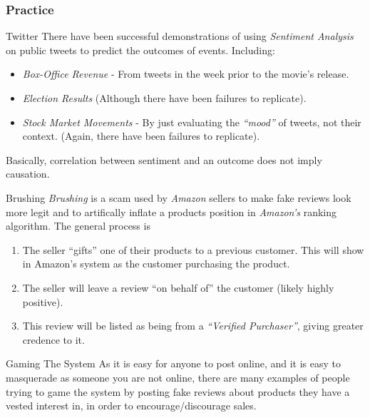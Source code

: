 \documentclass[11pt,a4paper]{article}
\begin{document}
\subsubsection{Practice} \label{sec_SentimentAnalysisPractice}

  \begin{remark}{Twitter}
    There have been successful demonstrations of using \textit{Sentiment Analysis} on public tweets to predict the outcomes of events. Including:
    \begin{itemize}
      \item \textit{Box-Office Revenue} - From tweets in the week prior to the movie's release.
      \item \textit{Election Results} (Although there have been failures to replicate).
      \item \textit{Stock Market Movements} - By just evaluating the \textit{``mood''} of tweets, not their context. (Again, there have been failures to replicate).
    \end{itemize}
    Basically, correlation between sentiment and an outcome does not imply causation.
  \end{remark}

  \begin{remark}{Brushing}
    \textit{Brushing} is a scam used by \textit{Amazon} sellers to make fake reviews look more legit and to artifically inflate a products position in \textit{Amazon's} ranking algorithm. The general process is
    \begin{enumerate}
      \item The seller ``gifts'' one of their products to a previous customer. This will show in Amazon's system as the customer purchasing the product.
      \item The seller will leave a review ``on behalf of'' the customer (likely highly positive).
      \item This review will be listed as being from a \textit{``Verified Purchaser''}, giving greater credence to it.
    \end{enumerate}
  \end{remark}

  \begin{remark}{Gaming The System}
    As it is easy for anyone to post online, and it is easy to masquerade as someone you are not online, there are many examples of people trying to game the system by posting fake reviews about products they have a vested interest in, in order to encourage/discourage sales.
  \end{remark}
\end{document}
